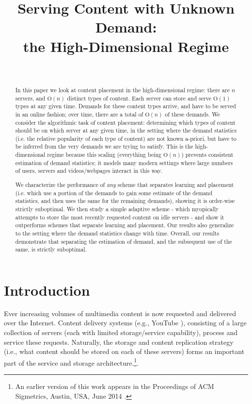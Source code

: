 \documentclass[10pt, conference, letterpaper]{IEEEtran}
\def \OO {\mathrm{O}}
\begin{document}
\title{Serving Content with Unknown Demand:\\ the High-Dimensional Regime}
\author{
	 \\
}


\maketitle

\begin{abstract}
In this paper we look at content placement in the high-dimensional regime: there are $n$ servers, and $\OO(n)$ distinct types of content. Each server can store and serve $\OO(1)$ types at any given time. Demands for these content types arrive, and have to be served in an online fashion; over time, there are a total of $\OO(n)$ of these demands. We consider the algorithmic task of content placement: determining which types of content should be on which server at any given time, in the setting where the demand statistics (i.e. the relative popularity of each type of content) are not known a-priori, but have to be inferred from the very demands we are trying to satisfy. This is the high-dimensional regime because this scaling (everything being $\OO(n)$) prevents consistent estimation of demand statistics; it models many modern settings where large numbers of users, servers and videos/webpages interact in this way.

We characterize the performance of \textit{any} scheme that separates learning and placement (i.e. which use a portion of the demands to gain some estimate of the demand statistics, and then uses the same for the remaining demands), showing it is order-wise strictly suboptimal. We then study a simple adaptive scheme - which myopically attempts to store the most recently requested content on idle servers - and show it outperforms schemes that separate learning and placement. Our results also generalize to the setting where the demand statistics change with time. Overall, our results demonstrate that separating the estimation of demand, and the subsequent use of the same, is strictly suboptimal.
\end{abstract}

\section{Introduction}
\label{sec:intro}

Ever increasing volumes of multimedia content is now requested and
delivered over the Internet. Content delivery systems (e.g., YouTube
\cite{Youtube}), consisting of a large collection of servers (each
with limited storage/service capability), process and service these
requests. Naturally, the storage and content replication strategy
(i.e., what content should be stored on each of these servers) forms an
important part of the service and storage architecture.\footnote{An earlier version of this work appears in the
	Proceedings of ACM Sigmetrics, Austin, USA, June 2014
	\cite{SGSS14}.}.
\end{document}
